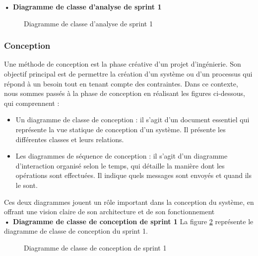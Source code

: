 \setlength{\parskip}{1em}
\setlength{\parindent}{0em}

\textbf{•	Diagramme de classe d'analyse de sprint 1 }


\begin{figure}[H]
  \centering
  \caption{Diagramme de classe d'analyse de sprint 1}
  \label{fig:class_analyse_auth}
\end{figure}


\subsubsection{Conception}


Une méthode de conception est la phase créative d'un projet d'ingénierie. Son objectif principal est de permettre la création d'un système ou d'un processus qui répond à un besoin tout en tenant compte des contraintes. Dans ce contexte, nous sommes passés à la phase de conception en réalisant les figures ci-dessous, qui comprennent :
\begin{itemize}
  
  \item Un diagramme de classe de conception : il s'agit d'un document essentiel qui représente la vue statique de conception d'un système. Il présente les différentes classes et leurs relations.\cite{classConception}
  \item Les diagrammes de séquence de conception : il s'agit d'un diagramme d'interaction organisé selon le temps, qui détaille la manière dont les opérations sont effectuées. Il indique quels messages sont envoyés et quand ils le sont. \cite{sequenceConception}
\end{itemize}

Ces deux diagrammes jouent un rôle important dans la conception du système, en offrant une vision claire de son architecture et de son fonctionnement\\

\textbf{•	Diagramme de classe de conception de sprint 1}
La figure \ref{fig:class_diagram_auth} représente le diagramme de classe de conception du sprint 1.

\begin{figure}[H]
  \centering
  \caption{Diagramme de classe de conception de sprint 1}
  \label{fig:class_diagram_auth}
\end{figure}


